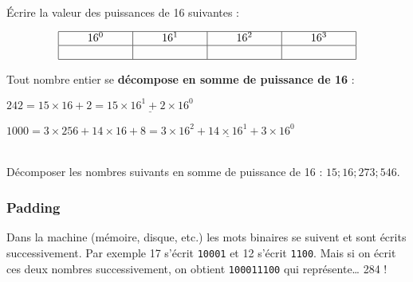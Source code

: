 \documentclass[a4paper,17pt]{extarticle}
\newenvironment{eleve}%
{\begin{activite}\color{noiramu}\\[-0.5cm]}
{\end{activite}}
\begin{document}
\begin{eleve}
    Écrire la valeur des puissances de 16 suivantes :

\[
\begin{array}{|c|c|c|c|} \hline
16^0 & 16^1 & 16^2 & 16^3 \\ \hline
\rule{2cm}{0cm} & \rule{2cm}{0cm} & \rule{2cm}{0cm} & \rule{2cm}{0cm} \\\hline
\end{array}
\]
        
        \end{eleve}\begin{exemple}
    Tout nombre entier se \textbf{décompose en somme de puissance de 16} :

\(242 = 15 \times 16 + 2 = \underline{15 \times 16^1 + 2 \times 16^0}\)

\(1000 = 3 \times 256 + 14 \times 16 + 8 = \underline{3 \times 16^2 + 14 \times 16^1 + 3 \times 16^0}\)

        \end{exemple}\begin{eleve}
    Décomposer les nombres suivants en somme de puissance de 16 :
\(15 ; 16 ; 273 ; 546\).
        
        \end{eleve}
    \hypertarget{padding}{%
\subsubsection{Padding}\label{padding}}

    Dans la machine (mémoire, disque, etc.) les mots binaires se suivent et
sont écrits successivement. Par exemple 17 s'écrit \texttt{10001} et 12
s'écrit \texttt{1100}. Mais si on écrit ces deux nombres successivement,
on obtient \texttt{100011100} qui représente\ldots{} 284 !
\end{document}
